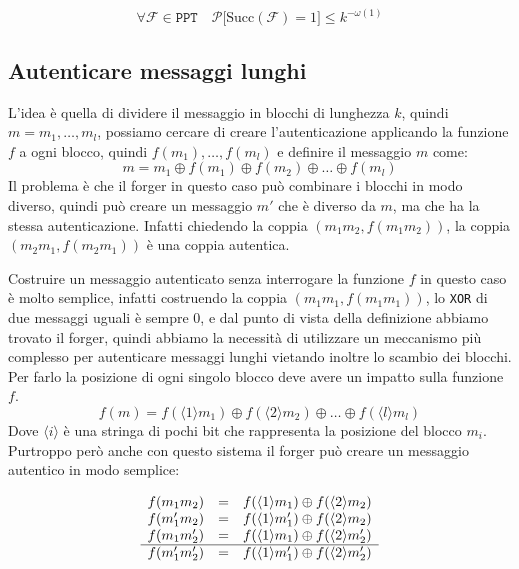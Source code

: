 \[
  \forall \mathcal{F} \in \texttt{PPT} \quad \mathcal{P}
  \big[ \text{Succ}(\mathcal{F}) = 1 \big] \leq k^{-\omega(1)}
\]
\subsection{Autenticare messaggi lunghi}
L'idea è quella di dividere il messaggio in blocchi di lunghezza $k$, quindi $m = m_1, \dots, m_l$, possiamo 
cercare di creare l'autenticazione applicando la funzione $f$ a ogni blocco, quindi $f(m_1), \dots, f(m_l)$ e 
definire il messaggio $m$ come:
\[
  m = m_1 \oplus f(m_1) \oplus f(m_2) \oplus \dots \oplus f(m_l)
\]
Il problema è che il forger in questo caso può combinare i blocchi in modo diverso, quindi può creare un
messaggio $m'$ che è diverso da $m$, ma che ha la stessa autenticazione.
Infatti chiedendo la coppia $(m_1m_2, f(m_1 m_2))$, la coppia $(m_2 m_1, f(m_2 m_1))$ è una coppia
autentica.

Costruire un messaggio autenticato senza interrogare la funzione $f$ in questo caso è molto semplice, 
infatti costruendo la coppia $(m_1 m_1, f(m_1 m_1))$, lo \texttt{XOR} di due messaggi uguali è sempre $0$,
e dal punto di vista della definizione abbiamo trovato il forger, quindi abbiamo la necessità di utilizzare 
un meccanismo più complesso per autenticare messaggi lunghi vietando inoltre lo scambio dei blocchi.
Per farlo la posizione di ogni singolo blocco deve avere un impatto sulla funzione $f$.
\[
  f(m) = f(\langle 1 \rangle m_1) \oplus f(\langle 2 \rangle m_2) \oplus
  \dots \oplus f(\langle l \rangle m_l)
\]
Dove $\langle i \rangle$ è una stringa di pochi bit che rappresenta la posizione del blocco $m_i$.
Purtroppo però anche con questo sistema il forger può creare un messaggio autentico in modo semplice:

\begin{align*}
  \begin{array}{r c l}
    f(m_1 m_2) & = & f(\langle 1 \rangle m_1) \oplus f(\langle 2 \rangle m_2) \\
    f(m_1' m_2) & = & f(\langle 1 \rangle m_1') \oplus f(\langle 2 \rangle m_2) \\
    f(m_1 m_2') & = & f(\langle 1 \rangle m_1) \oplus f(\langle 2 \rangle m_2') \\
    \hline
    f(m_1' m_2') & = & f(\langle 1 \rangle m_1') \oplus f(\langle 2 \rangle m_2') \\
  \end{array}
\end{align*}

